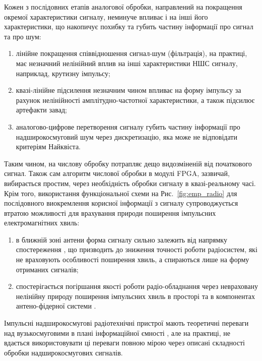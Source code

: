 Кожен з послідовних етапів аналогової обробки, направлений на покращення 
окремої характеристики сигналу, неминуче впливає і на інші його 
характеристики, що накопичує похибку та губить частину інформації про 
сигнал та про шум:

\begin{enumerate}
	\item лінійне покращення співвідношення сигнал-шум (фільтрація), 
	на практиці, має незначний нелінійний вплив на інші характеристики НШС 
	сигналу, наприклад, крутизну імпульсу;
	\item квазі-лінійне підсилення незначним чином впливає на 
	форму імпульсу за рахунок нелінійності амплітудно-частотної 
	характеристики, а також підсилює артефакти завад;
	\item аналогово-цифрове перетворення сигналу губить частину інформації 
	про надширокосмуговий шум через дискретизацію, яка може не відповідати 
	критеріям Найквіста.
\end{enumerate}

Таким чином, на числову обробку потрапляє дещо видозміненій від початкового
сигнал. Також сам алгоритм числової обробки в модулі FPGA, зазвичай,
вибирається простим, через необхідність обробки сигналу в квазі-реальному 
часі. Крім того, використання функціональної схеми на Рис.~\ref{fig:emp_radio} 
для послідовного виокремлення корисної інформації з сигналу супроводжується
втратою можливості для врахування природи поширення імпульсних 
електромагнітних хвиль:

\begin{enumerate}
	\item в ближній зоні антени форма сигналу сильно залежить від 
	напрямку спостереження \cite{imp:Wu1985, imp:Sodin1992-10, 
	my:Telecom2018}, що призводить до зниження точності роботи радіосистем, 
	які не враховують особливості поширення хвиль, а спираються лише на 
	форму отриманих сигналів;
	\item спостерігається погіршання якості роботи радіо-обладнання через 
	невраховану нелінійну природу поширення імпульсних хвиль в просторі та в 
	компонентах антено-фідерної системи \cite{imp:BaumSSN0401}.
\end{enumerate}

Імпульсні надширокосмугові радіотехнічні пристрої мають теоретичні 
переваги над вузькосмуговими в плані інформаційної ємності 
\cite{imp:ChannelLimitations}, але на практиці, не вдається використовувати 
ці переваги повною мірою через описані складності обробки надширокосмугових 
сигналів.


